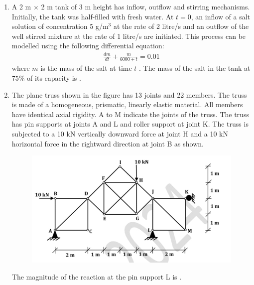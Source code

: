 \documentclass[journal,12pt,onecolumn]{article}
\theoremstyle{remark}
\begin{document}
\begin{enumerate}
    \hfill{}
    
    \item A 2 m $\times$ 2 m tank of 3 m height has inflow, outflow and stirring mechanisms. Initially, the tank was half-filled with fresh water. At $t = 0$, an inflow of a salt solution of concentration 5 g/m$^3$ at the rate of 2 litre/s and an outflow of the well stirred mixture at the rate of 1 litre/s are initiated. This process can be modelled using the following differential equation:
    \begin{align}
    \frac{dm}{dt} + \frac{m}{6000 + t} = 0.01
    \end{align}
    where $m$ is the mass  of the salt at time $t$ . The mass of the salt  in the tank at 75\% of its capacity is \underline{\hspace{2cm}} .
    
    \hfill{}
    
    \item The plane truss shown in the figure  has 13 joints and 22 members. The truss is made of a homogeneous, prismatic, linearly elastic material. All members have identical axial rigidity. A to M indicate the joints of the truss. The truss has pin supports at joints A and L and roller support at joint K. The truss is subjected to a 10 kN vertically downward force at joint H and a 10 kN horizontal force in the rightward direction at joint B as shown.
    \begin{figure}[H]
        \centering
        \includegraphics[width=0.7\columnwidth]{figs/1Q49.jpg}
        \caption{}
        \label{fig:q49}
    \end{figure}
    The magnitude of the reaction  at the pin support L is \underline{\hspace{2cm}} .
    
    \hfill{}
    

\end{enumerate}
\end{document}
